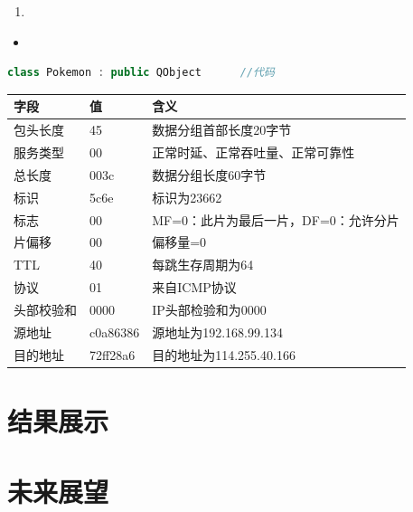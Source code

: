 \documentclass[a4paper, 14pt, oneside]{book} %
\numberwithin{equation}{subsection}
\begin{document}
	\begin{enumerate}
		\item 
	\end{enumerate}

	\begin{itemize}
		\item 
	\end{itemize}

	\begin{lstlisting}[language={C++}]
	class Pokemon : public QObject  	//代码
	\end{lstlisting}
	
	\begin{table}[H]
		\centering
		\begin{tabular}{lll}
			\hline
			字段 & 值 & 含义 \\ \hline
			包头长度 & 45 & 数据分组首部长度20字节 \\ \hline
			服务类型 & 00 & 正常时延、正常吞吐量、正常可靠性 \\ \hline
			总长度 & 003c & 数据分组长度60字节 \\ \hline
			标识 & 5c6e & 标识为23662 \\ \hline
			标志 & 00 & MF=0：此片为最后一片，DF=0：允许分片 \\ \hline
			片偏移 & 00 & 偏移量=0 \\ \hline
			TTL & 40 & 每跳生存周期为64 \\ \hline
			协议 & 01 & 来自ICMP协议 \\ \hline
			头部校验和 & 0000 & IP头部检验和为0000 \\ \hline
			源地址 & c0a86386 & 源地址为192.168.99.134 \\ \hline
			目的地址 & 72ff28a6 & 目的地址为114.255.40.166 \\ \hline
		\end{tabular}
	\end{table}
	
	\section{结果展示}
	
	\section{未来展望}
	
\end{document}
